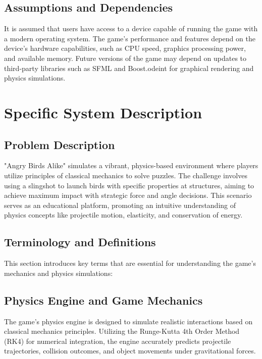\documentclass[12pt]{article}
\begin{document}
\subsection{Assumptions and Dependencies}

It is assumed that users have access to a device capable of running the game with a modern operating system. The game's performance and features depend on the device's hardware capabilities, such as CPU speed, graphics processing power, and available memory. Future versions of the game may depend on updates to third-party libraries such as SFML and Boost.odeint for graphical rendering and physics simulations.

\section{Specific System Description}

\subsection{Problem Description}
"Angry Birds Alike" simulates a vibrant, physics-based environment where players utilize principles of classical mechanics to solve puzzles. The challenge involves using a slingshot to launch birds with specific properties at structures, aiming to achieve maximum impact with strategic force and angle decisions. This scenario serves as an educational platform, promoting an intuitive understanding of physics concepts like projectile motion, elasticity, and conservation of energy.

\subsection{Terminology and Definitions}
This section introduces key terms that are essential for understanding the game's mechanics and physics simulations:

\subsection{Physics Engine and Game Mechanics}
The game's physics engine is designed to simulate realistic interactions based on classical mechanics principles. Utilizing the Runge-Kutta 4th Order Method (RK4) for numerical integration, the engine accurately predicts projectile trajectories, collision outcomes, and object movements under gravitational forces.
\end{document}
